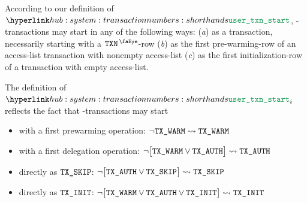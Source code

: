 \saNote{}
According to our definition of $\userTransactionStart$, \user{}-transactions may start in any of the following ways:
(\emph{a}) as a \txSkip{} transaction, necessarily starting with a $\peekTransaction$-row
(\emph{b}) as the first pre-warming-row of an access-list transaction with nonempty access-list
(\emph{c}) as the first initialization-row of a transaction with empty access-list.

\saNote{}
The definition of $\userTransactionStart _{i}$ reflects the fact that \user{}-transactions may start
\begin{itemize}
	\item with a first prewarming operation: $\neg \texttt{TX}\texttt{\_WARM} \rightsquigarrow \texttt{TX}\texttt{\_WARM}$
	\item with a first delegation operation: $\neg \big[\texttt{TX}\texttt{\_WARM} \vee \texttt{TX}\texttt{\_AUTH}              \big] \rightsquigarrow \texttt{TX}\texttt{\_AUTH}$
	\item directly as $\texttt{TX}\texttt{\_SKIP}$:             $\neg \big[\texttt{TX}\texttt{\_AUTH} \vee \texttt{TX}\texttt{\_SKIP}              \big] \rightsquigarrow \texttt{TX}\texttt{\_SKIP}$
	\item directly as $\texttt{TX}\texttt{\_INIT}$:             $\neg \big[\texttt{TX}\texttt{\_WARM} \vee \texttt{TX}\texttt{\_AUTH} \vee \texttt{TX}\texttt{\_INIT} \big] \rightsquigarrow \texttt{TX}\texttt{\_INIT}$
\end{itemize}

